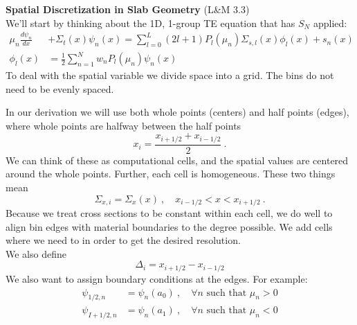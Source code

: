 \documentclass[12pt]{article}
\begin{document}
\textbf{Spatial Discretization in Slab Geometry} (L\&M 3.3)\\
We'll start by thinking about the 1D, 1-group TE equation that has $S_N$ applied:
\begin{align*}
\mu_n \frac{d \psi_n}{dx} &+ \Sigma_t(x) \psi_n(x) = \sum_{l=0}^L (2l+1) P_l(\mu_n) \Sigma_{s,l}(x) \phi_l(x) + s_n(x)\\
\phi_l(x) &= \frac{1}{2}\sum_{n=1}^N w_n P_l(\mu_n) \psi_n(x)
\end{align*}
%
To deal with the spatial variable we divide space into a grid. The bins do not need to be evenly spaced.\\ 
%
\begin{center}
\end{center}
%
In our derivation we will use both whole points (centers) and half points (edges), where whole points are halfway between the half points 
\[
x_{i} = \frac{x_{i+1/2} + x_{i-1/2}}{2} \:.
\]
We can think of these as computational cells, and the spatial values are centered around the whole points. Further, each cell is homogeneous. These two things mean
\[
\Sigma_{x,i} = \Sigma_x(x)\:, \quad x_{i-1/2} < x < x_{i+1/2} \:.
\]
Because we treat cross sections to be constant within each cell, we do well to align bin edges with material boundaries to the degree possible. We add cells where we need to in order to get the desired resolution.\\
We also define
\[
\Delta_i = x_{i+1/2} - x_{i-1/2}
\]
We also want to assign boundary conditions at the edges. For example:
\begin{align*}
\psi_{1/2,n} &= \psi_n(a_0)\:, \quad \forall n \text{ such that } \mu_n > 0 \\
\psi_{I+1/2,n} &= \psi_n(a_1)\:, \quad \forall n \text{ such that } \mu_n < 0 
\end{align*}
\end{document}

